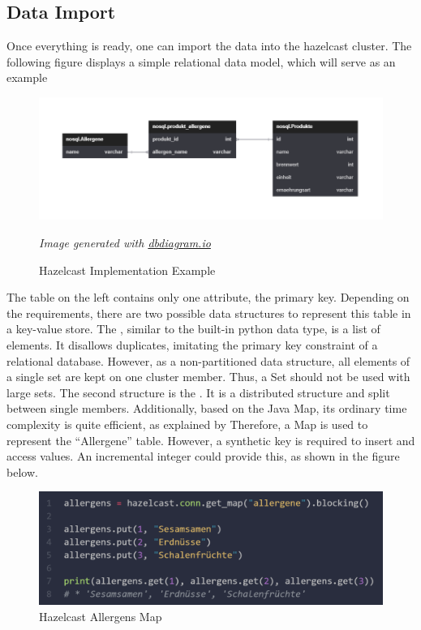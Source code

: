 \subsection{Data Import} \label{subsec:dataImportHazelcast}

Once everything is ready, one can import the data into the hazelcast cluster. The following figure displays 
a simple relational data model, which will serve as an example

\begin{figure}[H]
    \includegraphics[width=1\textwidth]{images/hazelcast.implementation.tables.png}
    \caption{Hazelcast Implementation Example} \label{fig:hazelcast.implementation.tables}
    \small\textit{Image generated with \href{https://dbdiagram.io/}{dbdiagram.io}}
\end{figure}

\noindent
The table on the left contains only one attribute, the primary key. Depending on the requirements, 
there are two possible data structures to represent this table in a key-value store. 
The \textcite{Hazelcast.DataStructure.Set}, similar to 
the built-in python data type, is a list of elements. It disallows duplicates, imitating the primary 
key constraint of a relational database. 
However, as a non-partitioned data structure, 
all elements of a single set are kept on one cluster member. Thus, a Set should not be used with large sets. 
The second structure is the \textcite{Hazelcast.DataStructure.Map}. It is a distributed structure and split between single members. 
Additionally, based on the Java Map, its ordinary time 
complexity is quite efficient, as explained by \textcite{Hazelcast.Java.Map} 
Therefore, a Map is used to represent the \enquote{Allergene} table. 
However, a synthetic key is required to insert and access values. 
An incremental integer could provide this, as shown in the figure below.


\begin{figure}[H]
    \includegraphics[width=1\textwidth]{images/hazelcast.allergens.map.png}
    \caption{Hazelcast Allergens Map} \label{fig:hazelcast.allergens.map}
\end{figure}

